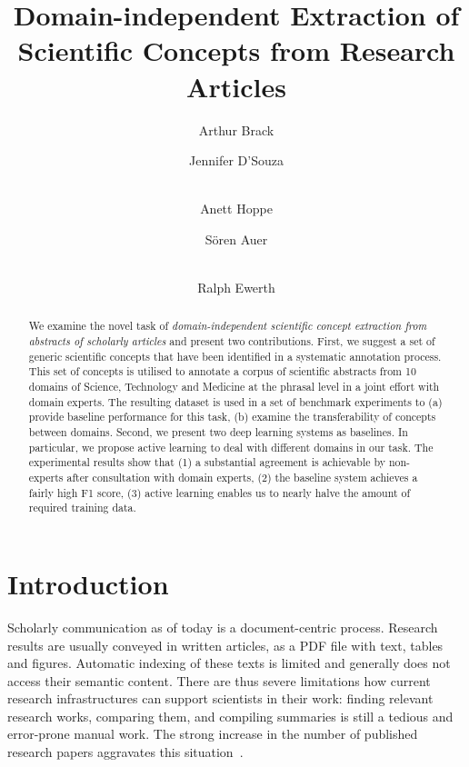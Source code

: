 \documentclass[runningheads]{llncs}
\begin{document}
\title{Domain-independent Extraction of Scientific Concepts from Research Articles}

\author{Arthur Brack
\and Jennifer D'Souza 
\and \\ Anett Hoppe
\and S\"oren Auer 
\and \\ Ralph Ewerth}



\maketitle              \begin{abstract}
We examine the novel task of 
\textit{domain-independent scientific concept extraction from abstracts of scholarly articles} and present two contributions. 
First, we suggest a set of generic scientific concepts that have been identified in a systematic annotation process. 
This set of concepts is utilised to annotate a corpus of scientific abstracts from 10 domains of Science, Technology and Medicine at the phrasal level in a joint effort with domain experts. 
The resulting dataset is used in a set of benchmark experiments to (a) provide baseline performance for this task, (b) examine the transferability of concepts between domains.
Second, we present two deep learning systems as baselines. 
In particular, we propose active learning to deal with different domains in our task.
The experimental results show that (1) a substantial agreement is achievable by non-experts after consultation with domain experts, (2) the baseline system achieves a fairly high F1 score, (3) active learning enables us to nearly halve the amount of required training data.




\end{abstract}

\section{Introduction}
Scholarly communication as of today is a document-centric process. Research results are usually conveyed in written articles, as a PDF file with text, tables and figures. Automatic indexing of these texts is limited and generally does not access their semantic content. There are thus severe limitations how current research infrastructures can support scientists in their work: finding relevant research works, comparing them, and compiling summaries is still a tedious and error-prone manual work. The strong increase in the number of published research papers aggravates this situation~\cite{bornmann15growth}. 
\end{document}
